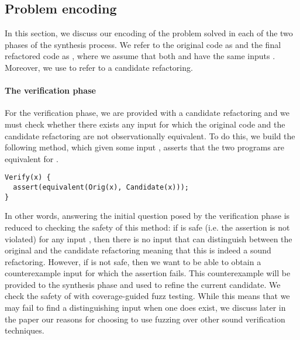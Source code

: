 \documentclass[runningheads,a4paper]{llncs}
\begin{document}



\subsection{Problem encoding}\label{sec:encoding}

In this section, we discuss our encoding of the problem solved in each
of the two phases of the synthesis process.  We refer to the original
code as  and the final refactored code as
, where we assume that both  and
 have the same inputs . Moreover,
we use  to refer to a candidate refactoring.


\paragraph{The verification phase} For the verification phase, we are provided with a candidate
refactoring and we must check whether there exists any input
 for which the original code and the candidate
refactoring are not observationally equivalent.  To do this, we build
the following  method, which given some input
, asserts that the two programs are equivalent for
.

\begin{lstlisting}[mathescape=true,showstringspaces=false]
Verify(x) {
  assert(equivalent(Orig(x), Candidate(x)));
}
\end{lstlisting}

In other words, answering the initial question posed by the verification
phase is reduced to checking the safety of this method: if
 is safe (i.e. the assertion is not violated) for any
input , then there is no input that can distinguish
between the original and the candidate refactoring meaning that this
is indeed a sound refactoring. However, if  is not safe,
then we want to be able to obtain a counterexample input
 for which the assertion fails. This counterexample
will be provided to the synthesis phase and used to refine the current
candidate. We check the safety of  with coverage-guided
fuzz testing. While this means that we may fail to find a
distinguishing input when one does exist, we discuss later in the
paper our reasons for choosing to use fuzzing over other sound
verification techniques.
\end{document}
